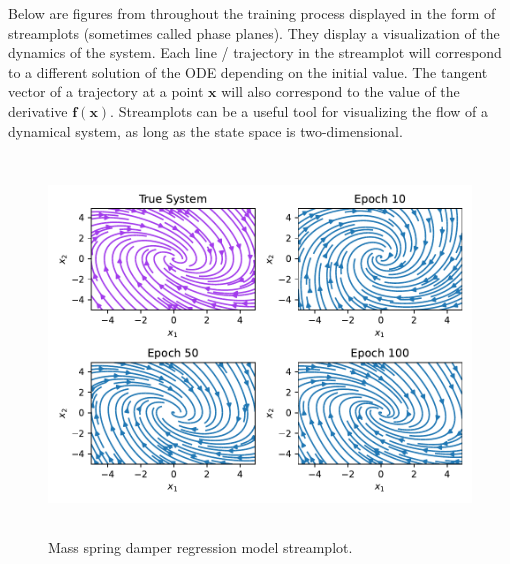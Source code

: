 \documentclass[12pt,a4paper]{book}
\begin{document}
Below are figures from throughout the training process displayed in the form of streamplots (sometimes called phase planes). They display a visualization of the dynamics of the system. Each line / trajectory in the streamplot will correspond to a different solution of the ODE depending on the initial value. The tangent vector of a trajectory at a point $\bm{x}$ will also correspond to the value of the derivative $\bm{f}(\bm{x})$. Streamplots can be a useful tool for visualizing the flow of a dynamical system, as long as the state space is two-dimensional.

\begin{figure}[H]
    \centering
    \includegraphics[height=10cm]{figs/plots/basic_experiments/mass_spring_damper_regressor_streamplot_01.pdf}
    \caption{Mass spring damper regression model streamplot.}
    \label{fig:mass_spring_damper_regressor_streamplot_01}
\end{figure}
\end{document}
